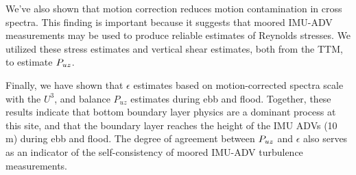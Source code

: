 We've also shown that motion correction reduces motion contamination in cross spectra. This finding is important because it suggests that moored IMU-ADV measurements may be used to produce reliable estimates of Reynolds stresses. We utilized these stress estimates and vertical shear estimates, both from the TTM, to estimate $P_{uz}$. 

Finally, we have shown that $\epsilon$ estimates based on motion-corrected spectra scale with the $U^3$, and balance $P_{uz}$ estimates during ebb and flood. Together, these results indicate that bottom boundary layer physics are a dominant process at this site, and that the boundary layer reaches the height of the IMU ADVs (10 m) during ebb and flood. The degree of agreement between $P_{uz}$ and $\epsilon$ also serves as an indicator of the self-consistency of moored IMU-ADV turbulence measurements. 

